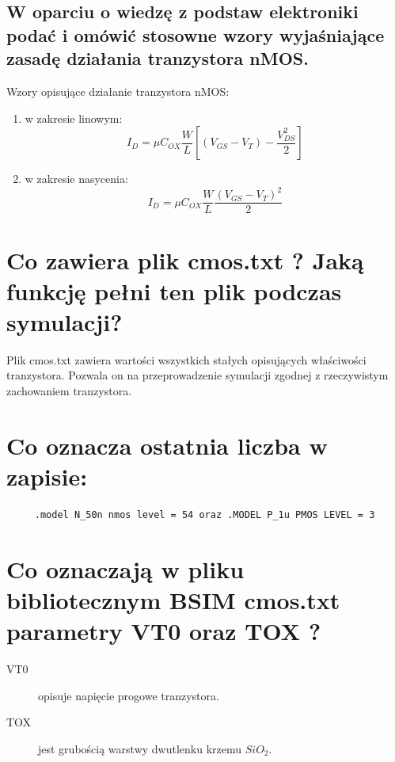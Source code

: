 \documentclass[a4paper, 11pt]{article}
\begin{document}
\subsection{W oparciu o wiedzę z podstaw elektroniki podać i omówić stosowne wzory wyjaśniające zasadę
	działania tranzystora nMOS.}\label{sub:12} %
Wzory opisujące działanie tranzystora nMOS:
\begin{enumerate}
	\item w zakresie linowym: \[
		      I_D = \mu C_{OX} \frac{W}{L} \left[ \left( V_{GS} - V_{T} \right) - \frac{V^2_{DS}}{2} \right] 	      \]
	\item w zakresie nasycenia: \[
		      I_D = \mu C_{OX} \frac{W}{L} \frac{\left( V_{GS} - V_{T} \right)^2}{2}
	      \]
\end{enumerate}






\section{Co zawiera plik cmos.txt ? Jaką funkcję pełni ten plik podczas symulacji?}\label{sec:zadanie_2} %

Plik cmos.txt zawiera wartości wszystkich stałych opisujących właściwości tranzystora.
Pozwala on na przeprowadzenie symulacji zgodnej z rzeczywistym zachowaniem tranzystora.


\section{Co oznacza ostatnia liczba w zapisie:}\label{sec:zadanie_3} %
\begin{verbatim}
	 .model N_50n nmos level = 54 oraz .MODEL P_1u PMOS LEVEL = 3
\end{verbatim}


\section{Co oznaczają w pliku bibliotecznym BSIM cmos.txt parametry VT0 oraz TOX ?}\label{sec:zadanie_4} %

\begin{description}
	\item[VT0] opisuje napięcie progowe tranzystora.
	\item[TOX] jest grubością warstwy dwutlenku krzemu $SiO_2$.
\end{description}

\end{document}
